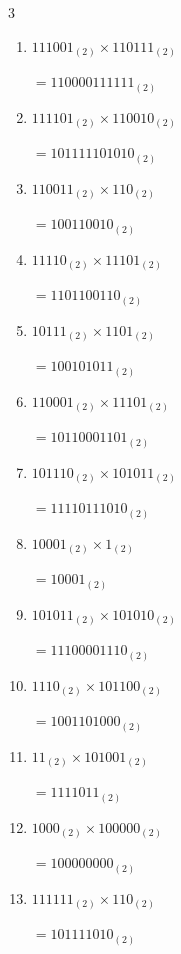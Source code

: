 \begin{multicols}{3}
\begin{enumerate}
  \item $111001_{(2)} \times 110111_{(2)}$

        $=110000111111_{(2)}$

  \item $111101_{(2)} \times 110010_{(2)}$

        $=101111101010_{(2)}$

  \item $110011_{(2)} \times 110_{(2)}$

        $=100110010_{(2)}$

\columnbreak %

  \item $11110_{(2)} \times 11101_{(2)}$

        $=1101100110_{(2)}$

  \item $10111_{(2)} \times 1101_{(2)}$

        $=100101011_{(2)}$

  \item $110001_{(2)} \times 11101_{(2)}$

        $=10110001101_{(2)}$

  \item $101110_{(2)} \times 101011_{(2)}$

        $=11110111010_{(2)}$

  \item $10001_{(2)} \times 1_{(2)}$

        $=10001_{(2)}$

\columnbreak %

  \item $101011_{(2)} \times 101010_{(2)}$

        $=11100001110_{(2)}$

  \item $1110_{(2)} \times 101100_{(2)}$

        $=1001101000_{(2)}$

  \item $11_{(2)} \times 101001_{(2)}$

        $=1111011_{(2)}$

  \item $1000_{(2)} \times 100000_{(2)}$

        $=100000000_{(2)}$

  \item $111111_{(2)} \times 110_{(2)}$

        $=101111010_{(2)}$

\columnbreak %


\end{enumerate}
\end{multicols}
